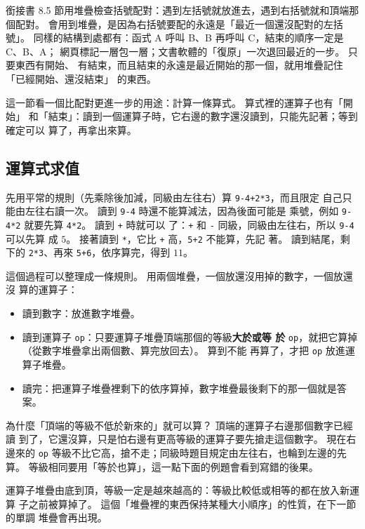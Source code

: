 銜接書 8.5 節用堆疊檢查括號配對：遇到左括號就放進去，遇到右括號就和頂端那
個配對。 會用到堆疊，是因為右括號要配的永遠是「最近一個還沒配對的左括號」。
同樣的結構到處都有：函式 A 呼叫 B、B 再呼叫 C，結束的順序一定是 C、B、A；
網頁標記一層包一層；文書軟體的「復原」一次退回最近的一步。 只要東西有開始、
有結束，而且結束的永遠是最近開始的那一個，就用堆疊記住「已經開始、還沒結束」
的東西。

這一節看一個比配對更進一步的用途：計算一條算式。 算式裡的運算子也有「開始」
和「結束」：讀到一個運算子時，它右邊的數字還沒讀到，只能先記著；等到確定可以
算了，再拿出來算。

\subsection{運算式求值}
\label{sec:expr-idea}

先用平常的規則（先乘除後加減，同級由左往右）算 \texttt{9-4+2*3}，而且限定
自己只能由左往右讀一次。 讀到 \texttt{9-4} 時還不能算減法，因為後面可能是
乘號，例如 \texttt{9-4*2} 就要先算 \texttt{4*2}。 讀到 \texttt{+} 時就可以
了：\texttt{+} 和 \texttt{-} 同級，同級由左往右，所以 \texttt{9-4} 可以先算
成 $5$。 接著讀到 \texttt{*}，它比 \texttt{+} 高，\texttt{5+2} 不能算，先記
著。 讀到結尾，剩下的 \texttt{2*3}、再來 \texttt{5+6}，依序算完，得到
$11$。

這個過程可以整理成一條規則。 用兩個堆疊，一個放還沒用掉的數字，一個放還沒
算的運算子：

\begin{itemize}
\item 讀到數字：放進數字堆疊。
\item 讀到運算子 \texttt{op}：只要運算子堆疊頂端那個的等級\textbf{大於或等
於} \texttt{op}，就把它算掉（從數字堆疊拿出兩個數、算完放回去）。 算到不能
再算了，才把 \texttt{op} 放進運算子堆疊。
\item 讀完：把運算子堆疊裡剩下的依序算掉，數字堆疊最後剩下的那一個就是答案。
\end{itemize}

為什麼「頂端的等級不低於新來的」就可以算？ 頂端的運算子右邊那個數字已經讀
到了，它還沒算，只是怕右邊有更高等級的運算子要先搶走這個數字。 現在右邊來的
\texttt{op} 等級不比它高，搶不走；同級時題目規定由左往右，也輪到左邊的先算。
等級相同要用「等於也算」，這一點下面的例題會看到寫錯的後果。

運算子堆疊由底到頂，等級一定是越來越高的：等級比較低或相等的都在放入新運算
子之前被算掉了。 這個「堆疊裡的東西保持某種大小順序」的性質，在下一節的單調
堆疊會再出現。


